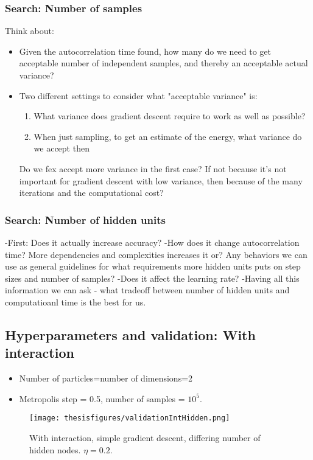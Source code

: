 \documentclass[twoside,english]{uiofysmaster}
\begin{document}
\subsubsection{Search: Number of samples}
Think about:
\begin{itemize}
	\item Given the autocorrelation time found, how many do we need to get acceptable number of independent samples, and thereby an acceptable actual variance?
	\item Two different settings to consider what "acceptable variance" is:
	\begin{enumerate}
 			\item What variance does gradient descent require to work as well as possible?
 			\item When just sampling, to get an estimate of the energy, what variance do we accept then
 	\end{enumerate}
 	Do we fex accept more variance in the first case? If not because it's not important for gradient descent with low variance, then because of the many iterations and the computational cost?
\end{itemize}

\subsubsection{Search: Number of hidden units}
-First: Does it actually increase accuracy?
-How does it change autocorrelation time? More dependencies and complexities increases it or? Any behaviors we can use as general guidelines for what requirements more hidden units puts on step sizes and number of samples?
-Does it affect the learning rate?
-Having all this information we can ask - what tradeoff between number of hidden units and computatioanl time is the best for us.


\subsection{Hyperparameters and validation: With interaction}

\begin{itemize}
	\item Number of particles=number of dimensions=2
	\item Metropolis step = 0.5, number of samples = $10^5$. 
\end{itemize}

\begin{figure}
\centering
 \texttt{[image: thesisfigures/validationIntHidden.png]}
 \caption{With interaction, simple gradient descent, differing number of hidden nodes. $\eta=0.2$.}
 \label{fig:validationIntHidden}
\end{figure}
\end{document}
